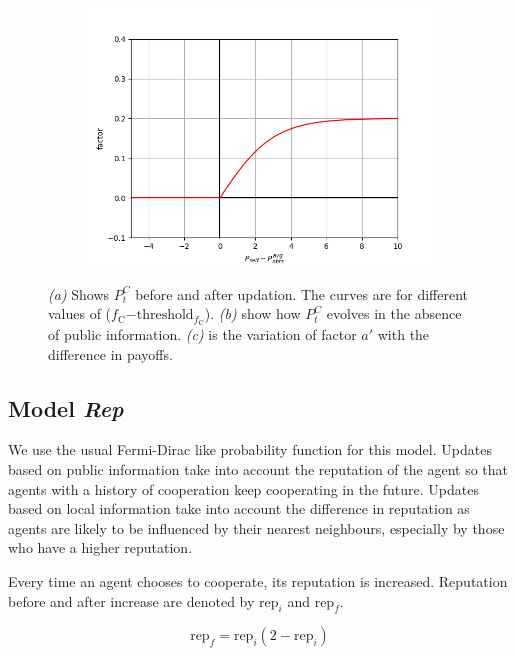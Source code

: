 \documentclass[11pt, A4 paper, twocolumn ]{article}
\newcommand{\fc}{$ f_{\text{C}} $}
\newcommand{\fcm}{f_{\text{C}}}
\begin{document}
\begin{figure}[h]
\begin{subfigure}[b]{0.23\textwidth}
		\caption{}
		\label{fig:fct2}
	\end{subfigure}
\begin{subfigure}[b]{0.23\textwidth}
	\centering
	\includegraphics[width=\textwidth]{graphs/fc-threshold-probupdate-factor}
	\caption{}
	\label{fig:fct3}
\end{subfigure}
	\caption{\footnotesize \textit{(a)} Shows $ P_{t}^{C}  $ before and after updation. The curves are for different values of (\fc $ - \text{threshold}_{\fcm} $). \textit{(b)} show how $ P_{t}^{C}  $ evolves in the absence of public information. \textit{(c)} is the variation of factor $ a' $ with the difference in payoffs. }
	\label{fig:fct}
\end{figure}

\subsection{Model \textit{Rep}}\label{app:3}
We use the usual Fermi-Dirac like probability function for this model. Updates based on public information take into account the reputation of the agent so that agents with a history of cooperation keep cooperating in the future. Updates based on local information take into account the difference in reputation as agents are likely to be influenced by their nearest neighbours, especially by those who have a higher reputation. \par 
Every time an agent chooses to cooperate, its reputation is increased. Reputation before and after increase are denoted by $ \text{rep}_{i} $ and $ \text{rep}_{f} $. 

\begin{equation}
	\text{rep}_{f} = \text{rep}_{i}(2-  \text{rep}_{i} )  
\end{equation}
\end{document}
